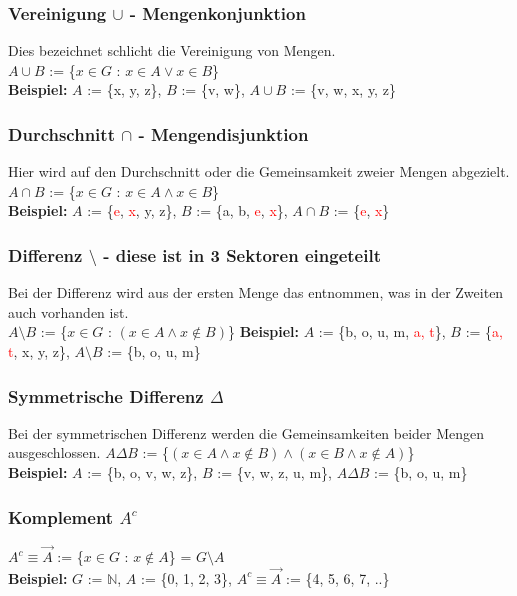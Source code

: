 \documentclass[a4paper,12pt]{article}
\begin{document}
\subsubsection{Vereinigung $\cup$ - Mengenkonjunktion}
Dies bezeichnet schlicht die Vereinigung von Mengen. \\
$A \cup B$ := \{$x \in G$ : $x \in A \lor x \in B$\} \\
\textbf{Beispiel:} $A$ := \{x, y, z\}, $B$ := \{v, w\}, $A \cup B$ := \{v, w, x, y, z\}

\subsubsection{Durchschnitt $\cap$ - Mengendisjunktion}
Hier wird auf den Durchschnitt oder die Gemeinsamkeit zweier Mengen abgezielt. \\
$A \cap B$ := \{$x \in G$ : $x \in A \land x \in B$\} \\
\textbf{Beispiel:} $A$ := \{\textcolor{red}{e}, \textcolor{red}{x}, y, z\}, $B$ := \{a, b, \textcolor{red}{e}, \textcolor{red}{x}\}, $A \cap B$ := \{\textcolor{red}{e}, \textcolor{red}{x}\}

\subsubsection{Differenz $\setminus$ - diese ist in 3 Sektoren eingeteilt}
Bei der Differenz wird aus der ersten Menge das entnommen, was in der Zweiten auch vorhanden ist. \\
$A \setminus B$ := \{$x \in G$ : $(x \in A \land x \not\in B)$\}
\textbf{Beispiel:} $A$ := \{b, o, u, m, \textcolor{red}{a, t}\}, $B$ := \{\textcolor{red}{a, t}, x, y, z\}, $A \setminus B$ := \{b, o, u, m\}

\subsubsection{Symmetrische Differenz $\Delta$}
Bei der symmetrischen Differenz werden die Gemeinsamkeiten beider Mengen ausgeschlossen.
$A \Delta B$ := \{$(x \in A \land x \not\in B) \land (x \in B \land x \not\in A)$\} \\
\textbf{Beispiel:} $A$ := \{b, o, v, w, z\}, $B$ := \{v, w, z, u, m\}, $A \Delta B$ := \{b, o, u, m\}

\subsubsection{Komplement $A^{c}$}
$A^{c} \equiv \vec{A}$ := \{$x \in G$ : $x \not\in A$\} = $G \setminus A$ \\
\textbf{Beispiel:} $G$ := $\mathbb{N}$, $A$ := \{0, 1, 2, 3\}, $A^{c} \equiv \vec{A}$ := \{4, 5, 6, 7, ..\}
\end{document}
